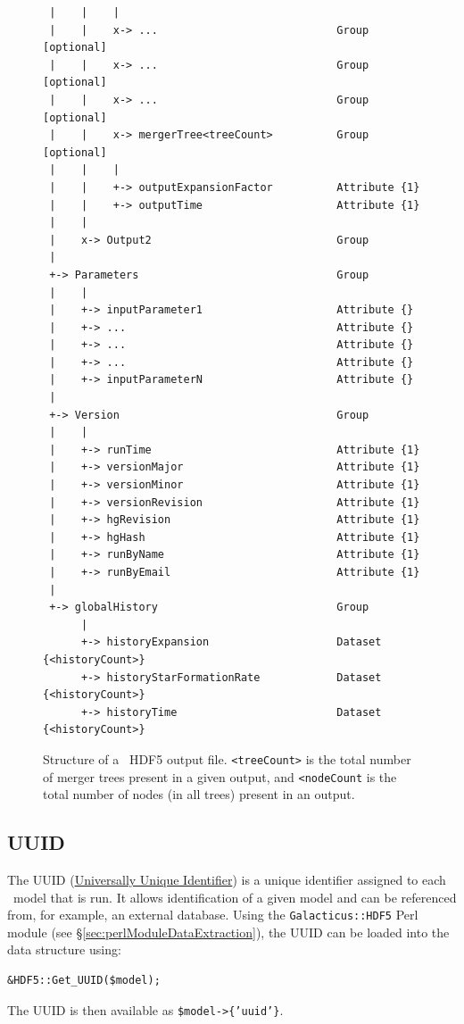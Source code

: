 \begin{figure}
\begin{center}
\begin{verbatim}
 |    |    |
 |    |    x-> ...                            Group              [optional]
 |    |    x-> ...                            Group              [optional]
 |    |    x-> ...                            Group              [optional]
 |    |    x-> mergerTree<treeCount>          Group              [optional]
 |    |    |
 |    |    +-> outputExpansionFactor          Attribute {1}
 |    |    +-> outputTime                     Attribute {1}
 |    |
 |    x-> Output2                             Group
 |
 +-> Parameters                               Group
 |    |
 |    +-> inputParameter1                     Attribute {}
 |    +-> ...                                 Attribute {}
 |    +-> ...                                 Attribute {}
 |    +-> ...                                 Attribute {}
 |    +-> inputParameterN                     Attribute {}
 |
 +-> Version                                  Group
 |    |
 |    +-> runTime                             Attribute {1}
 |    +-> versionMajor                        Attribute {1}
 |    +-> versionMinor                        Attribute {1}
 |    +-> versionRevision                     Attribute {1}
 |    +-> hgRevision                          Attribute {1}
 |    +-> hgHash                              Attribute {1}
 |    +-> runByName                           Attribute {1}
 |    +-> runByEmail                          Attribute {1}
 |
 +-> globalHistory                            Group
      |
      +-> historyExpansion                    Dataset {<historyCount>}
      +-> historyStarFormationRate            Dataset {<historyCount>}
      +-> historyTime                         Dataset {<historyCount>}
\end{verbatim}
\end{center}
\caption{Structure of a \glc\ HDF5 output file. {\tt <treeCount>} is the total number of merger trees present in a given output, and {\tt <nodeCount} is the total number of nodes (in all trees) present in an output.}
\label{fig:glcOutputFileStructure}
\end{figure}

\subsection{UUID}\label{sec:UUID}

The UUID (\href{https://secure.wikimedia.org/wikipedia/en/wiki/Universally_unique_identifier}{Universally Unique Identifier}) is a unique identifier assigned to each \glc\ model that is run. It allows identification of a given model and can be referenced from, for example, an external database. Using the {\tt Galacticus::HDF5} Perl module (see \S\ref{sec:perlModuleDataExtraction}), the UUID can be loaded into the data structure using:
\begin{verbatim}
&HDF5::Get_UUID($model);
\end{verbatim}
The UUID is then available as {\tt \$model-\textgreater\{'uuid'\}}.

